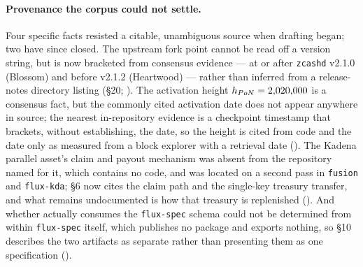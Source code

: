 \paragraph{Provenance the corpus could not settle.} Four specific facts resisted a citable,
unambiguous source when drafting began; two have since closed. The upstream \fluxd fork point cannot
be read off a version string, but is now bracketed from consensus evidence --- at or after
\texttt{zcashd} v2.1.0 (Blossom) and before v2.1.2 (Heartwood) --- rather than inferred from a
release-notes directory listing (§20; ). The
\PoN activation height $h_{PoN} = 2{,}020{,}000$ is a consensus fact, but the commonly cited activation
date does not appear anywhere in source; the nearest in-repository evidence is a checkpoint timestamp
that brackets, without establishing, the date, so the height is cited from code and the date only as
measured from a block explorer with a retrieval date (). The Kadena parallel
asset's claim and payout mechanism was absent from the repository named for it, which contains no
code, and was located on a second pass in \texttt{fusion} and \texttt{flux-kda}; §6 now cites the
claim path and the single-key treasury transfer, and what remains undocumented is how that treasury
is replenished ().
And whether \FluxOS actually consumes the \texttt{flux-spec} schema could not be determined from
within \texttt{flux-spec} itself, which publishes no package and exports nothing, so §10 describes the
two artifacts as separate rather than presenting them as one specification
().

